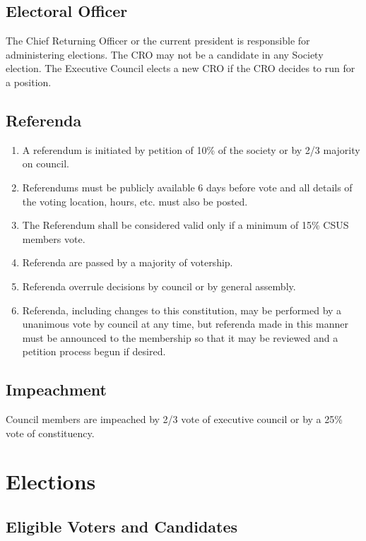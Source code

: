 \subsection{Electoral Officer}\label{electoral-officer}

The Chief Returning Officer or the current president is responsible for
administering elections. The CRO may not be a candidate in any Society
election. The Executive Council elects a new CRO if the CRO decides to
run for a position.

\subsection{Referenda}\label{referenda}

\begin{enumerate}
\def\labelenumi{\arabic{enumi}.}
\item
  A referendum is initiated by petition of 10\% of the society or by 2/3
  majority on council.
\item
  Referendums must be publicly available 6 days before vote and all
  details of the voting location, hours, etc. must also be posted.
\item
  The Referendum shall be considered valid only if a minimum of 15\%
  CSUS members vote.
\item
  Referenda are passed by a majority of votership.
\item
  Referenda overrule decisions by council or by general assembly.
\item
  Referenda, including changes to this constitution, may be performed by
  a unanimous vote by council at any time, but referenda made in this
  manner must be announced to the membership so that it may be reviewed
  and a petition process begun if desired.
\end{enumerate}

\subsection{Impeachment}\label{impeachment}

Council members are impeached by 2/3 vote of executive council or by a
25\% vote of constituency.

\section{Elections}\label{elections}

\subsection{Eligible Voters and
Candidates}\label{eligible-voters-and-candidates}


